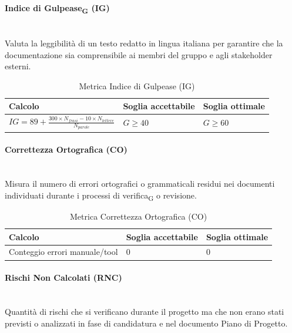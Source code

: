 \documentclass[11pt,a4paper]{article}
\newcommand{\gls}[1]{#1\textsubscript{G}}
\begin{document}
\paragraph{Indice di Gulpease\textsubscript{G} (IG)} \hfill \\
Valuta la leggibilità di un testo redatto in lingua italiana per garantire che la documentazione sia comprensibile ai membri del gruppo e agli stakeholder esterni.

\begin{table}[H]
    \centering
    \renewcommand{\arraystretch}{1.5}
    \begin{tabular}{|M{0.4\textwidth}|M{0.25\textwidth}|M{0.25\textwidth}|}
        \hline
        \textbf{Calcolo} & \textbf{Soglia accettabile} & \textbf{Soglia ottimale} \\
        \hline
        $IG = 89 + \frac{300 \times N_{frasi} - 10 \times N_{lettere}}{N_{parole}}$ & $G \ge 40$ & $G \ge 60$ \\
        \hline
    \end{tabular}
    \caption{Metrica Indice di Gulpease (IG)}
\end{table}

\paragraph{Correttezza Ortografica (CO)} \hfill \\
Misura il numero di errori ortografici o grammaticali residui nei documenti individuati durante i processi di \gls{verifica} o revisione.

\begin{table}[H]
    \centering
    \renewcommand{\arraystretch}{1.5}
    \begin{tabular}{|M{0.4\textwidth}|M{0.25\textwidth}|M{0.25\textwidth}|}
        \hline
        \textbf{Calcolo} & \textbf{Soglia accettabile} & \textbf{Soglia ottimale} \\
        \hline
        Conteggio errori manuale/tool & 0 & 0 \\
        \hline
    \end{tabular}
    \caption{Metrica Correttezza Ortografica (CO)}
\end{table}

\paragraph{Rischi Non Calcolati (RNC)} \hfill \\
Quantità di rischi che si verificano durante il progetto ma che non erano stati previsti o analizzati in fase di candidatura e nel documento Piano di Progetto.
\end{document}
